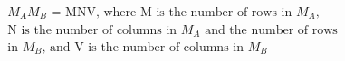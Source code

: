 \documentclass[preview]{standalone}
\begin{document}
\begin{center}
\begin{align*}&M_{A} M_{B} \text{ = MNV, where M is the number of rows in } M_A \text{,} \\ &\text{N is the number of columns in } M_{A} \text{ and the number of rows} \\&\text{in } M_B \text{, and V is the number of columns in } M_B\end{align*}
\end{center}
\end{document}
